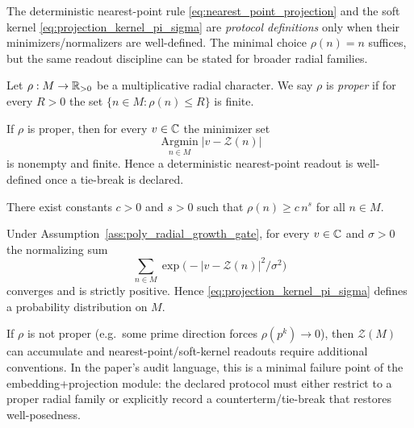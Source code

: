 \AuditTag The deterministic nearest-point rule \eqref{eq:nearest_point_projection} and the soft kernel \eqref{eq:projection_kernel_pi_sigma} are \emph{protocol definitions} only when their minimizers/normalizers are well-defined.
The minimal choice $\rho(n)=n$ suffices, but the same readout discipline can be stated for broader radial families.

\begin{definition}\label{def:radial_properness_gate}
Let $\rho:M\to\mathbb{R}_{>0}$ be a multiplicative radial character.
We say $\rho$ is \emph{proper} if for every $R>0$ the set $\{n\in M:\rho(n)\le R\}$ is finite.
\end{definition}

\begin{proposition}\label{prop:nearest_point_finite_under_properness}
\MathTag If $\rho$ is proper, then for every $v\in\mathbb{C}$ the minimizer set
\[
\operatorname*{Argmin}_{n\in M}|v-\mathcal{Z}(n)|
\]
is nonempty and finite. Hence a deterministic nearest-point readout is well-defined once a tie-break is declared.
\end{proposition}

\begin{assumption}\label{ass:poly_radial_growth_gate}
There exist constants $c>0$ and $s>0$ such that $\rho(n)\ge c\,n^s$ for all $n\in M$.
\end{assumption}

\begin{proposition}\label{prop:soft_kernel_normalization_under_growth}
\MathTag Under Assumption~\ref{ass:poly_radial_growth_gate}, for every $v\in\mathbb{C}$ and $\sigma>0$ the normalizing sum
\[
\sum_{n\in M}\exp\!\bigl(-|v-\mathcal{Z}(n)|^2/\sigma^2\bigr)
\]
converges and is strictly positive. Hence \eqref{eq:projection_kernel_pi_sigma} defines a probability distribution on $M$.
\end{proposition}

\begin{remark}\label{rem:nonproper_radial_failure_mode}
\AuditTag If $\rho$ is not proper (e.g.\ some prime direction forces $\rho(p^k)\to 0$), then $\mathcal{Z}(M)$ can accumulate and nearest-point/soft-kernel readouts require additional conventions.
In the paper's audit language, this is a minimal failure point of the embedding+projection module: the declared protocol must either restrict to a proper radial family or explicitly record a counterterm/tie-break that restores well-posedness.
\end{remark}

